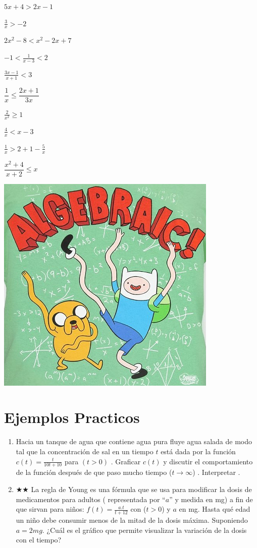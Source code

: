 \documentclass[a4paper,11pt,spanish,sans]{exam}
\begin{document}
\begin{enumerate}
\begin{multicols}{3}
\item $5x+4 > 2x-1 $
\item $\frac{3}{x} > -2 $
\item $2x^2-8 < x^2-2x+7$
\item $  -1< \frac{1}{x-3} < 2$
\item $\frac{3x-1}{x+1} < 3$

\columnbreak

\item $\dfrac{1}{x} \leq \dfrac{2x+1}{3x}$
\item $\frac{2}{x^2}\geq 1$
\item $\frac{4}{x} < x-3$
\item $\frac{1}{x} >  2+1-\frac{5}{x}$
\item $\dfrac{x^2+4}{x+2} \leq x$

\columnbreak

\includegraphics[width= 0.7\columnwidth]{algebraic.png}
\label{fig:algeb}

\end{multicols}
\end{enumerate} 

\section{Ejemplos Practicos}
\begin{enumerate}
\item Hacia un tanque de agua que contiene agua pura fluye agua salada de modo tal que la concentración de sal en un tiempo $t$ está dada por la función $c(t)=\frac{t}{10t+10}$ para $(t>0)$ . Graficar $c(t)$ y discutir el comportamiento de la función después de que paso mucho tiempo ($t\longrightarrow \infty$) . Interpretar .

\item $\bigstar \bigstar$ La regla de Young es una fórmula que se usa para modificar la dosis de medicamentos para adultos ( representada por “$a$” y medida en mg) a fin de que sirvan para niños: $f(t)=\frac{a.t}{t+12}$ con ($t>0$) y $a$ en mg.
Hasta qué edad un niño debe consumir menos de la mitad de la dosis máxima. Suponiendo $a=2 mg$. ¿Cuál es el gráfico que permite visualizar la variación de la dosis con el tiempo?
\end{enumerate}
\end{document}
